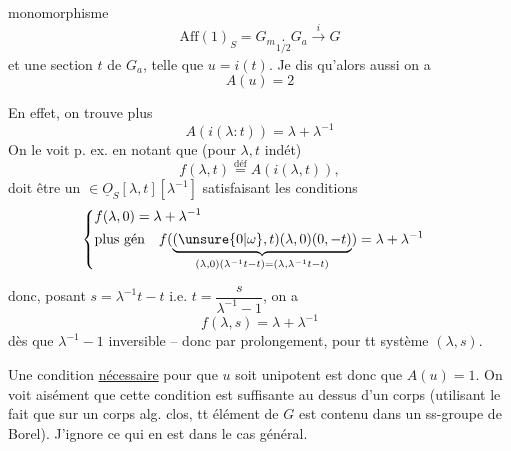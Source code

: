 monomorphisme
\[
\mathrm{Aff}(1)_S=G_m\underset{1/2}{\boldsymbol{.}}G_a\xrightarrow{i}G
\]
et une section $t$ de $G_a$, telle que $u=i(t)$. Je dis qu'alors aussi on a
\[
A(u)=2
\]

En effet, on trouve plus  
\[
A(i(\lambda:t))=\lambda+\lambda^{-1}
\]
On le voit p. ex. en notant que (pour $\lambda,t$ indét)
\[
f(\lambda,t)\overset{\text{déf}}{=}A(i(\lambda,t)),
\]
doit être un $\in\underline O_S[\lambda,t][\lambda^{-1}]$ satisfaisant les conditions
\[
\begin{aligned}
&\left\{\begin{aligned}
&f(\lambda,0)=\lambda+\lambda^{-1}\\
&\text{plus gén}\quad f(\underbrace{(\unsure{0|\omega},t)(\lambda,0)(0,-t)}_{(\lambda,0)(\lambda^{-1}t-t)=(\lambda,\lambda^{-1}t-t)})=\lambda+\lambda^{-1}
\end{aligned}\right.
\end{aligned}
\]

donc, posant $s=\lambda^{-1}t-t$ i.e. $t=\dfrac{s}{\lambda^{-1}-1}$, on a
\[
f(\lambda,s)=\lambda+\lambda^{-1}
\]
dès que $\lambda^{-1}-1$ inversible -- donc par prolongement, pour tt système $(\lambda,s)$.

Une condition \uline{nécessaire} pour que $u$ soit unipotent est donc que $A(u)=1$. On voit aisément que cette condition est suffisante au dessus d'un corps (utilisant le fait que sur un corps alg. clos, tt élément de $G$ est contenu dans un ss-groupe de Borel). J'ignore ce qui en est dans le cas général.

